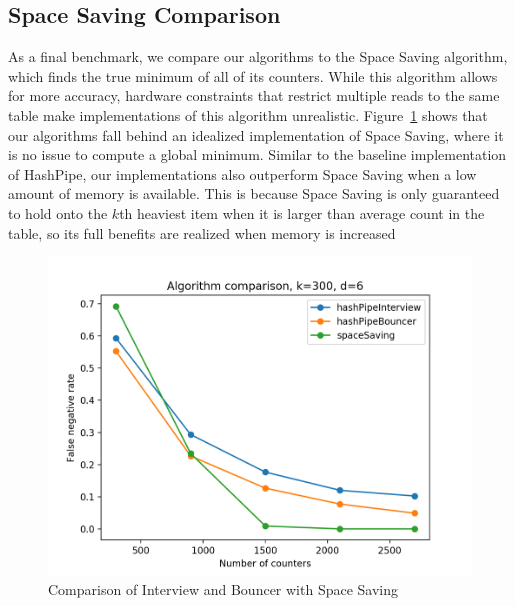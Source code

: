 \subsection{Space Saving Comparison}
As a final benchmark, we compare our algorithms to the Space Saving algorithm, which finds the true minimum of all of its counters. While this algorithm allows for more accuracy, hardware constraints that restrict multiple reads to the same table make implementations of this algorithm unrealistic. Figure~\ref{fig:spacesaver} shows that our algorithms fall behind an idealized implementation of Space Saving, where it is no issue to compute a global minimum. Similar to the baseline implementation of HashPipe, our implementations also outperform Space Saving when a low amount of memory is available. This is because Space Saving is only guaranteed to hold onto the $k$th heaviest item when it is larger than average count in the table, so its full benefits are realized when memory is increased
\begin{figure}[!htb]
  \centering
    \includegraphics[scale=0.42]{spacesaver}
     \caption{Comparison of Interview and Bouncer with Space Saving}
     \label{fig:spacesaver}
\end{figure}